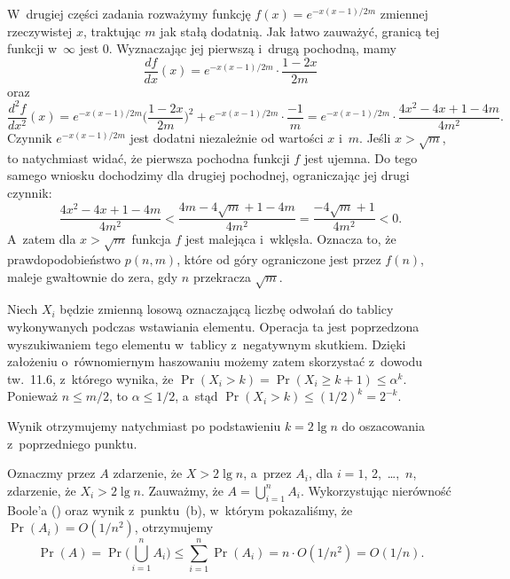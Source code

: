 W~drugiej części zadania rozważymy funkcję $f(x)=e^{-x(x-1)/2m}$ zmiennej rzeczywistej $x$, traktując $m$ jak stałą dodatnią. Jak łatwo zauważyć, granicą tej funkcji w~$\infty$ jest 0. Wyznaczając jej pierwszą i~drugą pochodną, mamy
\[
	\frac{df}{dx}(x) = e^{-x(x-1)/2m}\cdot\frac{1-2x}{2m}
\]
oraz
\[
	\frac{d^2\!f}{dx^2}(x) = e^{-x(x-1)/2m}\biggl(\frac{1-2x}{2m}\biggr)^2+e^{-x(x-1)/2m}\cdot\frac{-1}{m} = e^{-x(x-1)/2m}\cdot\frac{4x^2-4x+1-4m}{4m^2}.
\]
Czynnik $e^{-x(x-1)/2m}$ jest dodatni niezależnie od wartości $x$ i~$m$. Jeśli $x>\sqrt{m}$, to natychmiast widać, że pierwsza pochodna funkcji $f$ jest ujemna. Do tego samego wniosku dochodzimy dla drugiej pochodnej, ograniczając jej drugi czynnik:
\[
	\frac{4x^2-4x+1-4m}{4m^2} < \frac{4m-4\sqrt{m}+1-4m}{4m^2} = \frac{-4\sqrt{m}+1}{4m^2} < 0.
\]
A~zatem dla $x>\sqrt{m}$ funkcja $f$ jest malejąca i~wklęsła. Oznacza to, że prawdopodobieństwo $p(n,m)$, które od góry ograniczone jest przez $f(n)$, maleje gwałtownie do zera, gdy $n$ przekracza $\sqrt{m}$.

\problems


\subproblem %
Niech $X_i$ będzie zmienną losową oznaczającą liczbę odwołań do tablicy wykonywanych podczas wstawiania  elementu. Operacja ta jest poprzedzona wyszukiwaniem tego elementu w~tablicy z~negatywnym skutkiem. Dzięki założeniu o~równomiernym haszowaniu możemy zatem skorzystać z~dowodu tw.~11.6, z~którego wynika, że $\Pr(X_i>k)=\Pr(X_i\ge k+1)\le\alpha^k$. Ponieważ $n\le m/2$, to $\alpha\le1/2$, a~stąd $\Pr(X_i>k)\le(1/2)^k=2^{-k}$.

\subproblem %
Wynik otrzymujemy natychmiast po podstawieniu $k=2\lg n$ do oszacowania z~poprzedniego punktu.

\subproblem %
Oznaczmy przez $A$ zdarzenie, że $X>2\lg n$, a~przez $A_i$, dla $i=1$, 2,~\dots,~$n$, zdarzenie, że $X_i>2\lg n$. Zauważmy, że $A=\bigcup_{i=1}^nA_i$. Wykorzystując nierówność Boole'a () oraz wynik z~punktu~(b), w~którym pokazaliśmy, że $\Pr(A_i)=O(1/n^2)$, otrzymujemy
\[
	\Pr(A) = \Pr\biggl(\bigcup_{i=1}^nA_i\biggr) \le \sum_{i=1}^n\Pr(A_i) = n\cdot O(1/n^2) = O(1/n).
\]

